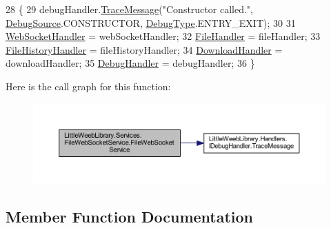\begin{DoxyCode}
28         \{           
29             debugHandler.\mbox{\hyperlink{interface_little_weeb_library_1_1_handlers_1_1_i_debug_handler_a2e405bc3492e683cd3702fae125221bc}{TraceMessage}}(\textcolor{stringliteral}{"Constructor called."}, 
      \mbox{\hyperlink{namespace_little_weeb_library_1_1_handlers_a2a6ca0775121c9c503d58aa254d292be}{DebugSource}}.CONSTRUCTOR, \mbox{\hyperlink{namespace_little_weeb_library_1_1_handlers_ab66019ed40462876ec4e61bb3ccb0a62}{DebugType}}.ENTRY\_EXIT);
30 
31             \mbox{\hyperlink{class_little_weeb_library_1_1_handlers_1_1_web_socket_handler}{WebSocketHandler}} = webSocketHandler;
32             \mbox{\hyperlink{class_little_weeb_library_1_1_handlers_1_1_file_handler}{FileHandler}} = fileHandler;
33             \mbox{\hyperlink{class_little_weeb_library_1_1_handlers_1_1_file_history_handler}{FileHistoryHandler}} = fileHistoryHandler;
34             \mbox{\hyperlink{class_little_weeb_library_1_1_handlers_1_1_download_handler}{DownloadHandler}} = downloadHandler;
35             \mbox{\hyperlink{class_little_weeb_library_1_1_handlers_1_1_debug_handler}{DebugHandler}} = debugHandler;
36         \}
\end{DoxyCode}
Here is the call graph for this function\+:\nopagebreak
\begin{figure}[H]
\begin{center}
\leavevmode
\includegraphics[width=350pt]{class_little_weeb_library_1_1_services_1_1_file_web_socket_service_a06fb16d6cce4fdc44878a384ad85efc4_cgraph}
\end{center}
\end{figure}


\subsection{Member Function Documentation}
\mbox{\label{class_little_weeb_library_1_1_services_1_1_file_web_socket_service_ab1375e8e82a50dfa06d91bebe988d133}} 
